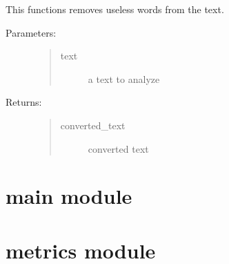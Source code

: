 \documentclass[letterpaper,10pt,english]{sphinxmanual}
\begin{document}
\begin{fulllineitems}
\label{\detokenize{func:func.removeUnnededWords}}
\pysigstartsignatures
{}
\pysigstopsignatures
\sphinxAtStartPar
This functions removes useless words from the text.
\begin{description}
\item[{Parameters:}] \leavevmode\begin{quote}\begin{description}
\item[{text}] \leavevmode
\sphinxAtStartPar
a text to analyze

\end{description}\end{quote}

\item[{Returns:}] \leavevmode\begin{quote}\begin{description}
\item[{converted\_text}] \leavevmode
\sphinxAtStartPar
converted text

\end{description}\end{quote}

\end{description}

\end{fulllineitems}


\sphinxstepscope


\section{main module}
\label{\detokenize{main:module-main}}\label{\detokenize{main:main-module}}\label{\detokenize{main::doc}}
\sphinxstepscope


\section{metrics module}
\label{\detokenize{metrics:module-metrics}}\label{\detokenize{metrics:metrics-module}}\label{\detokenize{metrics::doc}}
\end{document}
